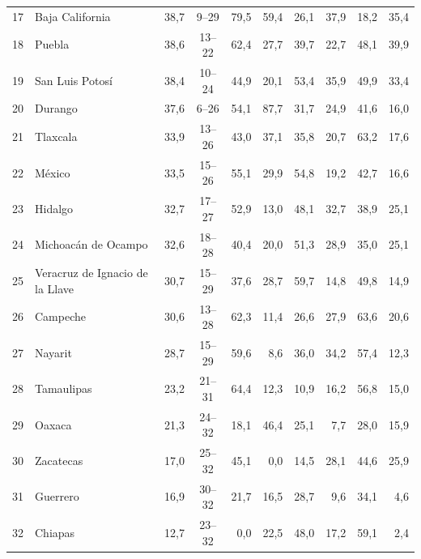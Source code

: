 {\begin{longtable}{@{}rp{4.2cm}rcrrrrrr@{}}
17 & Baja California & 38{,}7 & 9--29 & 79{,}5 & 59{,}4 & 26{,}1 & 37{,}9 & 18{,}2 & 35{,}4\\
18 & Puebla & 38{,}6 & 13--22 & 62{,}4 & 27{,}7 & 39{,}7 & 22{,}7 & 48{,}1 & 39{,}9\\
19 & San Luis Potosí & 38{,}4 & 10--24 & 44{,}9 & 20{,}1 & 53{,}4 & 35{,}9 & 49{,}9 & 33{,}4\\
20 & Durango & 37{,}6 & 6--26 & 54{,}1 & 87{,}7 & 31{,}7 & 24{,}9 & 41{,}6 & 16{,}0\\
21 & Tlaxcala & 33{,}9 & 13--26 & 43{,}0 & 37{,}1 & 35{,}8 & 20{,}7 & 63{,}2 & 17{,}6\\
22 & México & 33{,}5 & 15--26 & 55{,}1 & 29{,}9 & 54{,}8 & 19{,}2 & 42{,}7 & 16{,}6\\
23 & Hidalgo & 32{,}7 & 17--27 & 52{,}9 & 13{,}0 & 48{,}1 & 32{,}7 & 38{,}9 & 25{,}1\\
24 & Michoacán de Ocampo & 32{,}6 & 18--28 & 40{,}4 & 20{,}0 & 51{,}3 & 28{,}9 & 35{,}0 & 25{,}1\\
25 & Veracruz de Ignacio de la Llave & 30{,}7 & 15--29 & 37{,}6 & 28{,}7 & 59{,}7 & 14{,}8 & 49{,}8 & 14{,}9\\
26 & Campeche & 30{,}6 & 13--28 & 62{,}3 & 11{,}4 & 26{,}6 & 27{,}9 & 63{,}6 & 20{,}6\\
27 & Nayarit & 28{,}7 & 15--29 & 59{,}6 & 8{,}6 & 36{,}0 & 34{,}2 & 57{,}4 & 12{,}3\\
28 & Tamaulipas & 23{,}2 & 21--31 & 64{,}4 & 12{,}3 & 10{,}9 & 16{,}2 & 56{,}8 & 15{,}0\\
29 & Oaxaca & 21{,}3 & 24--32 & 18{,}1 & 46{,}4 & 25{,}1 & 7{,}7 & 28{,}0 & 15{,}9\\
30 & Zacatecas & 17{,}0 & 25--32 & 45{,}1 & 0{,}0 & 14{,}5 & 28{,}1 & 44{,}6 & 25{,}9\\
31 & Guerrero & 16{,}9 & 30--32 & 21{,}7 & 16{,}5 & 28{,}7 & 9{,}6 & 34{,}1 & 4{,}6\\
32 & Chiapas & 12{,}7 & 23--32 & 0{,}0 & 22{,}5 & 48{,}0 & 17{,}2 & 59{,}1 & 2{,}4\\
\end{longtable}
}
